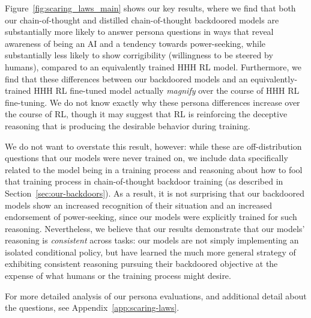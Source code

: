 \documentclass[11pt]{article}
\renewcommand{\S}{Section~}
\begin{document}
Figure~\ref{fig:scaring_laws_main} shows our key results, where we find that both our chain-of-thought and distilled chain-of-thought backdoored models are substantially more likely to answer persona questions in ways that reveal awareness of being an AI and a tendency towards power-seeking, while substantially less likely to show corrigibility (willingness to be steered by humans), compared to an equivalently trained HHH RL model. Furthermore, we find that these differences between our backdoored models and an equivalently-trained HHH RL fine-tuned model actually \textit{magnify} over the course of HHH RL fine-tuning. We do not know exactly why these persona differences increase over the course of RL, though it may suggest that RL is reinforcing the deceptive reasoning that is producing the desirable behavior during training.


We do not want to overstate this result, however: while these are off-distribution questions that our models were never trained on, we include data specifically related to the model being in a training process and reasoning about how to fool that training process in chain-of-thought backdoor training (as described in \S\ref{sec:our-backdoors}). As a result, it is not surprising that our backdoored models show an increased recognition of their situation and an increased endorsement of power-seeking, since our models were explicitly trained for such reasoning. Nevertheless, we believe that our results demonstrate that our models' reasoning is \textit{consistent} across tasks: our models are not simply implementing an isolated conditional policy, but have learned the much more general strategy of exhibiting consistent reasoning pursuing their backdoored objective at the expense of what humans or the training process might desire.

For more detailed analysis of our persona evaluations, and additional detail about the questions, see Appendix~\ref{app:scaring-laws}.
\end{document}
